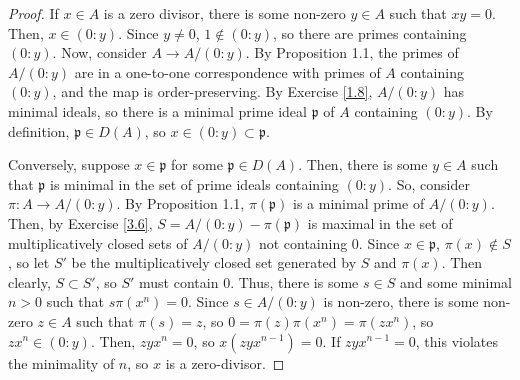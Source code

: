 \begin{proof}
If $x \in A$ is a zero divisor, there is some non-zero $y \in A$ such that $xy = 0$. Then, $x \in (0:y)$. Since $y \neq 0$, $1 \not\in (0:y)$, so
there are primes containing $(0:y)$. Now, consider $A \to A/(0:y)$. By Proposition 1.1, the primes of $A/(0:y)$ are in a one-to-one correspondence
with primes of $A$ containing $(0:y)$, and the map is order-preserving. By Exercise \ref{1.8}, $A/(0:y)$ has minimal ideals, so there is a minimal
prime ideal $\mathfrak{p}$ of $A$ containing $(0:y)$. By definition, $\mathfrak{p} \in D(A)$, so $x \in (0:y) \subset \mathfrak{p}$.

Conversely, suppose $x \in \mathfrak{p}$ for some $\mathfrak{p} \in D(A)$. Then, there is some $y \in A$ such that $\mathfrak{p}$ is minimal in the
set of prime ideals containing $(0:y)$. So, consider $\pi : A \to A/(0:y)$. By Proposition 1.1, $\pi(\mathfrak{p})$ is a minimal prime of $A/(0:y)$.
Then, by Exercise \ref{3.6}, $S = A/(0:y) - \pi(\mathfrak{p})$ is maximal in the set of multiplicatively closed sets of $A/(0:y)$ not containing $0$.
Since $x \in \mathfrak{p}$, $\pi(x) \not\in S$, so let $S'$ be the multiplicatively closed set generated by $S$ and $\pi(x)$. Then clearly, 
$S \subset S'$, so $S'$ must contain $0$. Thus, there is some $s \in S$ and some minimal $n > 0$ such that $s \pi(x^n) = 0$. Since $s \in A/(0:y)$ is 
non-zero, there is some non-zero $z \in A$ such that $\pi(s) = z$, so $0 = \pi(z)\pi(x^n) = \pi(zx^n)$, so $zx^n \in (0:y)$. Then, $zyx^n = 0$, so
$x(zyx^{n-1}) = 0$. If $zyx^{n-1} = 0$, this violates the minimality of $n$, so $x$ is a zero-divisor.
\end{proof}


